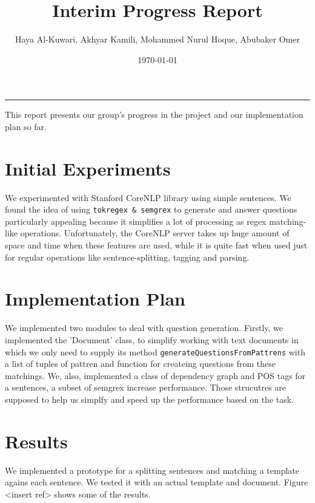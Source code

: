 \documentclass{article}
\title{Interim Progress Report}
\author{Haya Al-Kuwari, Akhyar Kamili, Mohammed Nurul Hoque, Abubaker Omer}
\date{\today}
\begin{document}
    \maketitle
    \noindent\rule{\textwidth}{1pt}
    This report presents our group's progress in the project and our implementation plan so far.

    \section{Initial Experiments}
    We experimented with Stanford CoreNLP library using simple sentences. We found the idea of using
    \texttt{tokregex \& semgrex} to generate and answer questions particularly appealing because it simplifies a lot of processing as
    regex matching-like operations. Unfortunately, the CoreNLP server takes up huge amount of space and
    time when these features are used, while it is quite fast when used just for regular
    operations like sentence-splitting, tagging and parsing.

    \section{Implementation Plan}
    We implemented two modules to deal with question generation. Firstly, we implemented the 'Document' class, to simplify working with text documents in which we only need to supply its method \texttt{generateQuestionsFromPattrens} with a list of tuples of pattren and function for createing questions from these matchings. We, also, implemented a class of dependency graph and POS tags for a sentences, a subset of semgrex increase performance. Those strucutres are supposed to help us simplfy and speed up the performance based on the task.

    \section{Results}
    We implemented a prototype for a splitting sentences and matching a template agains each
    sentence. We tested it with an actual template and document. Figure <insert ref> shows some of
    the results.
    
\end{document}
